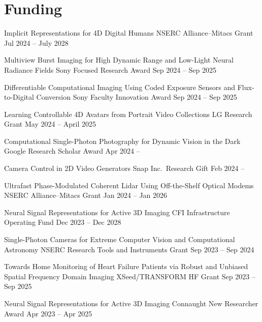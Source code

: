 
\section{Funding}
\begingroup
\let\bfseries\relax

\cventry[0.5em]{}
{Implicit Representations for 4D Digital Humans}
{NSERC Alliance--Mitacs Grant}
{Jul 2024 -- July 2028}
{}
{}

\cventry[0.5em]{}
{\small Multiview Burst Imaging for High Dynamic Range and Low-Light Neural Radiance Fields}
{Sony Focused Research Award}
{Sep 2024 -- Sep 2025}
{}
{}

\cventry[0.5em]{}
{\small Differentiable Computational Imaging Using Coded Exposure Sensors and Flux-to-Digital Conversion}
{Sony Faculty Innovation Award}
{\hspace{-1em}Sep 2024 -- Sep 2025}
{}
{}

\cventry[0.5em]{}
{Learning Controllable 4D Avatars from Portrait Video Collections}
{LG Research Grant}
{May 2024 -- April 2025}
{}
{}

\cventry[0.5em]{}
{Computational Single-Photon Photography for Dynamic Vision in the Dark}
{Google Research Scholar Award}
{Apr 2024 --}
{}
{}

\cventry[0.5em]{}
{Camera Control in 2D Video Generators}
{Snap Inc.\ Research Gift}
{Feb 2024 --}
{}
{}

\cventry[0.5em]{}
{Ultrafast Phase-Modulated Coherent Lidar Using Off-the-Shelf Optical Modems}
{NSERC Alliance--Mitacs Grant}
{Jan 2024 -- Jan 2026}
{}
{}

\cventry[0.5em]{}
{Neural Signal Representations for Active 3D Imaging}
{CFI Infrastructure Operating Fund}
{Dec 2023 -- Dec 2028}
{}
{}

\cventry[0.5em]{}
{Single-Photon Cameras for Extreme Computer Vision and Computational Astronomy}
{NSERC Research Tools and Instruments Grant}
{Sep 2023 -- Sep 2024}
{}
{}

\cventry[0.5em]{}
{\small Towards Home Monitoring of Heart Failure Patients via Robust and Unbiased Spatial Frequency Domain Imaging}
{XSeed/TRANSFORM HF Grant}
{\hspace{-13em}Sep 2023 -- Sep 2025}
{}
{}

\cventry[0.5em]{}
{Neural Signal Representations for Active 3D Imaging}
{Connaught New Researcher Award}
{\hspace{-1em}Apr 2023 -- Apr 2025}
{}
{}


